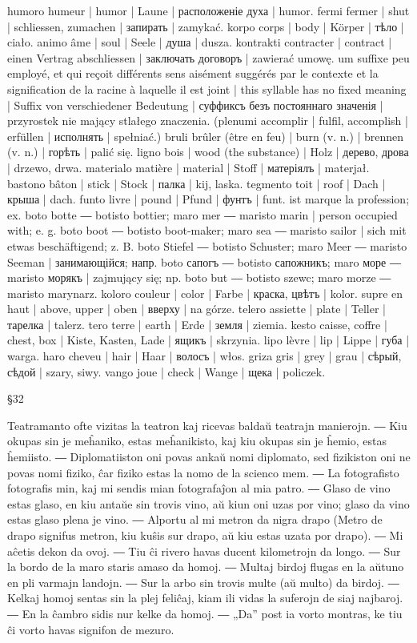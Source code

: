 humoro humeur | humor | Laune | расположеніе духа | humor.
fermi fermer | shut | schliessen, zumachen | запирать | zamykać.
korpo corps | body | Körper | тѣло | ciało.
animo âme | soul | Seele | душа | dusza.
kontrakti contracter | contract | einen Vertrag abschliessen | заключать договоръ | zawierać umowę.
um suffixe peu employé, et qui reçoit différents sens aisément suggérés par le contexte et la signification de la racine à laquelle il est joint | this syllable has no fixed meaning | Suffix von verschiedener Bedeutung | суффиксъ безъ постояннаго значенія | przyrostek nie mający stlałego znaczenia.
(plenumi accomplir | fulfil, accomplish | erfüllen | исполнять | spełniać.)
bruli brûler (être en feu) | burn (v. n.) | brennen (v. n.) | горѣть | palić się.
ligno bois | wood (the substance) | Holz | дерево, дрова | drzewo, drwa.
materialo matière | material | Stoff | матеріялъ | materjał.
bastono bâton | stick | Stock | палка | kij, laska.
tegmento toit | roof | Dach | крыша | dach.
funto livre | pound | Pfund | фунтъ | funt.
ist marque la profession; ex. boto botte ― botisto bottier; maro mer ― maristo marin | person occupied with; e. g. boto boot ― botisto boot-maker; maro sea ― maristo sailor | sich mit etwas beschäftigend; z. B. boto Stiefel ― botisto Schuster; maro Meer ― maristo Seeman | занимающійся; напр. boto сапогъ ― botisto сапожникъ; maro море ― maristo морякъ | zajmujący się; np. boto but ― botisto szewc; maro morze ― maristo marynarz.
koloro couleur | color | Farbe | краска, цвѣтъ | kolor.
supre en haut | above, upper | oben | вверху | na górze.
telero assiette | plate | Teller | тарелка | talerz.
tero terre | earth | Erde | земля | ziemia.
kesto caisse, coffre | chest, box | Kiste, Kasten, Lade | ящикъ | skrzynia.
lipo lèvre | lip | Lippe | губа | warga.
haro cheveu | hair | Haar | волосъ | włos.
griza gris | grey | grau | сѣрый, сѣдой | szary, siwy.
vango joue | check | Wange | щека | policzek.

§32

Teatramanto ofte vizitas la teatron kaj ricevas baldaŭ teatrajn manierojn. ― Kiu okupas sin je meĥaniko, estas meĥanikisto, kaj kiu okupas sin je ĥemio, estas ĥemiisto. ― Diplomatiiston oni povas ankaŭ nomi diplomato, sed fizikiston oni ne povas nomi fiziko, ĉar fiziko estas la nomo de la scienco mem. ― La fotografisto fotografis min, kaj mi sendis mian fotografaĵon al mia patro. ― Glaso de vino estas glaso, en kiu antaŭe sin trovis vino, aŭ kiun oni uzas por vino; glaso da vino estas glaso plena je vino. ― Alportu al mi metron da nigra drapo (Metro de drapo signifus metron, kiu kuŝis sur drapo, aŭ kiu estas uzata por drapo). ― Mi aĉetis dekon da ovoj. ― Tiu ĉi rivero havas ducent kilometrojn da longo. ― Sur la bordo de la maro staris amaso da homoj. ― Multaj birdoj flugas en la aŭtuno en pli varmajn landojn. ― Sur la arbo sin trovis multe (aŭ multo) da birdoj. ― Kelkaj homoj sentas sin la plej feliĉaj, kiam ili vidas la suferojn de siaj najbaroj. ― En la ĉambro sidis nur kelke da homoj. ― „Da” post ia vorto montras, ke tiu ĉi vorto havas signifon de mezuro.

